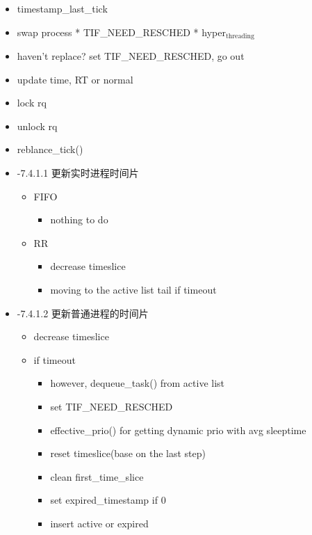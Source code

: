 \documentclass[11pt]{article}
\begin{document}
\begin{itemize}
\item timestamp\_last\_tick
\item swap process
  * TIF\_NEED\_RESCHED
  * hyper$_{\mathrm{threading}}$
\item haven't replace? set TIF\_NEED\_RESCHED, go out
\item update time, RT or normal
\item lock rq
\item unlock rq
\item reblance\_tick()
\end{itemize}
\begin{itemize}

\item -7.4.1.1 更新实时进程时间片\\
\label{sec-2.4.1.1}

\begin{itemize}
\item FIFO

\begin{itemize}
\item nothing to do
\end{itemize}

\item RR

\begin{itemize}
\item decrease timeslice
\item moving to the active list tail if timeout
\end{itemize}

\end{itemize}

\item -7.4.1.2 更新普通进程的时间片\\
\label{sec-2.4.1.2}

\begin{itemize}
\item decrease timeslice
\item if timeout

\begin{itemize}
\item however, dequeue\_task() from active list
\item set TIF\_NEED\_RESCHED
\item effective\_prio() for getting dynamic prio with avg sleeptime
\item reset timeslice(base on the last step)
\item clean first\_time\_slice
\item set expired\_timestamp if 0
\item insert active or expired


\end{itemize}
\end{itemize}
\end{itemize}
\end{document}

